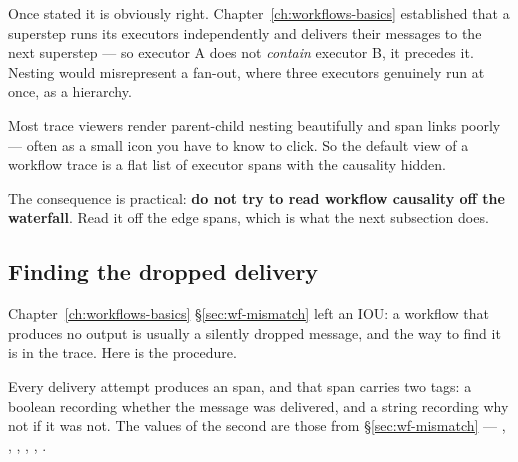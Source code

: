 Once stated it is obviously right. Chapter~\ref{ch:workflows-basics} established
that a superstep runs its executors independently and delivers their messages to
the next superstep --- so executor A does not \emph{contain} executor B, it
precedes it. Nesting would misrepresent a fan-out, where three executors genuinely
run at once, as a hierarchy.

\begin{warning}
Most trace viewers render parent-child nesting beautifully and span links poorly
--- often as a small icon you have to know to click. So the default view of a
workflow trace is a flat list of executor spans with the causality hidden.

The consequence is practical: \textbf{do not try to read workflow causality off
the waterfall}. Read it off the edge spans, which is what the next subsection
does.
\end{warning}


\subsection{Finding the dropped delivery}
\label{sec:obs-dropped}

Chapter~\ref{ch:workflows-basics} \S\ref{sec:wf-mismatch} left an IOU: a workflow
that produces no output is usually a silently dropped message, and the way to
find it is in the trace. Here is the procedure.

Every delivery attempt produces an  span, and that span
carries two tags: a boolean recording whether the message was delivered, and a
string recording why not if it was not. The values of the second are those from
\S\ref{sec:wf-mismatch} --- , ,
, , ,
.

